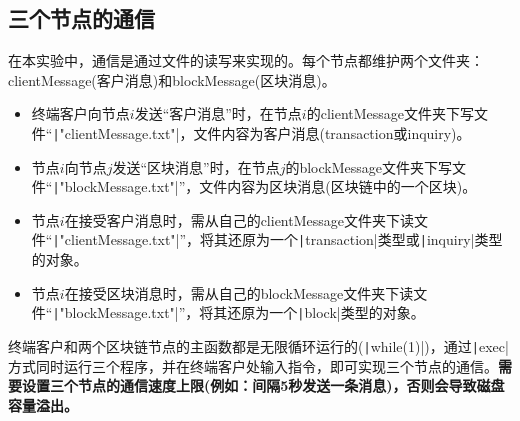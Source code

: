 \documentclass[10pt,a4paper]{article}
\begin{document}
    \subsection{三个节点的通信}
    在本实验中，通信是通过文件的读写来实现的。每个节点都维护两个文件夹：clientMessage(客户消息)和blockMessage(区块消息)。
    \begin{itemize}
        \item 终端客户向节点$i$发送“客户消息”时，在节点$i$的clientMessage文件夹下写文件“\texttt|"clientMessage.txt"|，文件内容为客户消息(transaction或inquiry)。
        \item 节点$i$向节点$j$发送“区块消息”时，在节点$j$的blockMessage文件夹下写文件“\texttt|"blockMessage.txt"|”，文件内容为区块消息(区块链中的一个区块)。
        \item 节点$i$在接受客户消息时，需从自己的clientMessage文件夹下读文件“\texttt|"clientMessage.txt"|”，将其还原为一个\texttt|transaction|类型或\texttt|inquiry|类型的对象。
        \item 节点$i$在接受区块消息时，需从自己的blockMessage文件夹下读文件“\texttt|"blockMessage.txt"|”，将其还原为一个\texttt|block|类型的对象。
    \end{itemize}
    终端客户和两个区块链节点的主函数都是无限循环运行的(\texttt|while(1)|)，通过\texttt|exec|方式同时运行三个程序，并在终端客户处输入指令，即可实现三个节点的通信。\textbf{需要设置三个节点的通信速度上限(例如：间隔5秒发送一条消息)，否则会导致磁盘容量溢出。}
\end{document}
